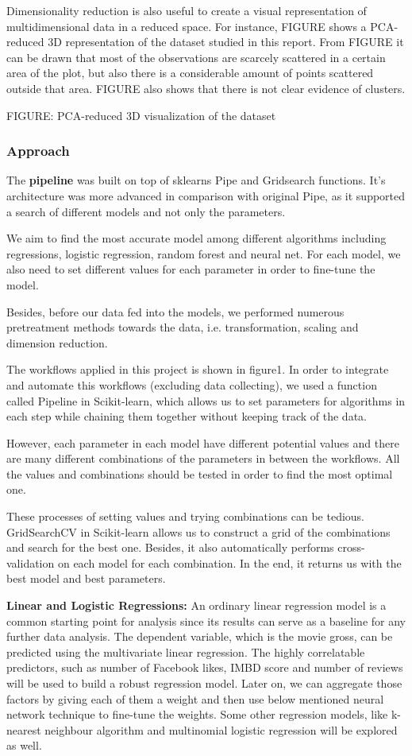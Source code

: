 Dimensionality reduction is also useful to create a visual representation of multidimensional data in a reduced space. For instance, FIGURE shows a PCA-reduced 3D representation of the dataset studied in this report. From FIGURE it can be drawn that most of the observations are scarcely scattered in a certain area of the plot, but also there is a considerable amount of points scattered outside that area. FIGURE also shows that there is not clear evidence of clusters. 

FIGURE: PCA-reduced 3D visualization of the dataset

\subsubsection{Approach}
The \textbf{pipeline} was built on top of sklearns Pipe and Gridsearch functions. It’s architecture was more advanced in comparison with original Pipe, as it supported a search of different models and not only the parameters.

We aim to find the most accurate model among different algorithms including regressions, logistic regression, random forest and neural net. For each model, we also need to set different values for each parameter in order to fine-tune the model.
 
Besides, before our data fed into the models, we performed numerous pretreatment methods towards the data, i.e. transformation, scaling and dimension reduction.
 
The workflows applied in this project is shown in figure1. In order to integrate and automate this workflows (excluding data collecting), we used a function called Pipeline in Scikit-learn, which allows us to set parameters for algorithms in each step while chaining them together without keeping track of the data.

However, each parameter in each model have different potential values and there are many different combinations of the parameters in between the workflows. All the values and combinations should be tested in order to find the most optimal one.
 
These processes of setting values and trying combinations can be tedious. GridSearchCV in Scikit-learn allows us to construct a grid of the combinations and search for the best one. Besides, it also automatically performs cross-validation on each model for each combination. In the end, it returns us with the best model and best parameters.

\textbf{Linear and Logistic Regressions:}
An ordinary linear regression model is a common starting point for analysis since its results can serve as a baseline for any further data analysis. The dependent variable, which is the movie gross, can be predicted using the multivariate linear regression. The highly correlatable predictors, such as number of Facebook likes, IMBD score and number of reviews will be used to build a robust regression model. Later on, we can aggregate those factors by giving each of them a weight and then use below mentioned neural network technique to fine-tune the weights. Some other regression models, like k-nearest neighbour algorithm and multinomial logistic regression will be explored as well.

